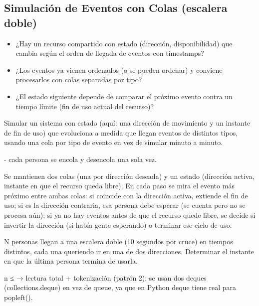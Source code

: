 \subsection{Simulación de Eventos con Colas (escalera doble)}
\label{alg:7-4}


\begin{itemize}
\item ¿Hay un recurso compartido con estado (dirección, disponibilidad) que cambia según el orden de llegada de eventos con timestamps?
\item ¿Los eventos ya vienen ordenados (o se pueden ordenar) y conviene procesarlos con colas separadas por tipo?
\item ¿El estado siguiente depende de comparar el próximo evento contra un tiempo límite (fin de uso actual del recurso)?
\end{itemize}

 Simular un sistema con estado (aquí: una dirección de movimiento y un instante de fin de uso) que evoluciona a medida que llegan eventos de distintos tipos, usando una cola por tipo de evento en vez de simular minuto a minuto.

  - cada persona se encola y desencola una sola vez.

 Se mantienen dos colas (una por dirección deseada) y un estado (dirección activa, instante en que el recurso queda libre). En cada paso se mira el evento más próximo entre ambas colas: si coincide con la dirección activa, extiende el fin de uso; si es la dirección contraria, esa persona debe esperar (se cuenta pero no se procesa aún); si ya no hay eventos antes de que el recurso quede libre, se decide si invertir la dirección (si había gente esperando) o terminar ese ciclo de uso.


N personas llegan a una escalera doble (10 segundos por cruce) en tiempos distintos, cada una queriendo ir en una de dos direcciones. Determinar el instante en que la última persona termina de usarla.

 n ≤  → lectura total + tokenización (patrón 2); se usan dos deques (collections.deque) en vez de queue, ya que en Python deque tiene  real para popleft().


